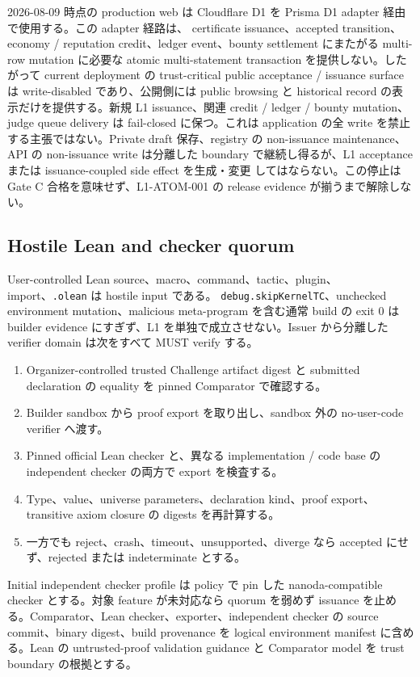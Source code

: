 \documentclass[a4paper,11pt]{ltjsarticle}
\newcommand{\code}[1]{\texttt{#1}}
\begin{document}
2026-08-09 時点の production web は Cloudflare D1 を Prisma D1 adapter 経由で使用する。この adapter 経路は、
certificate issuance、accepted transition、economy / reputation credit、ledger event、bounty settlement にまたがる
multi-row mutation に必要な atomic multi-statement transaction を提供しない。したがって current deployment の
trust-critical public acceptance / issuance surface は write-disabled であり、公開側には public browsing と historical
record の表示だけを提供する。新規 L1 issuance、関連 credit / ledger / bounty mutation、judge queue delivery は fail-closed
に保つ。これは application の全 write を禁止する主張ではない。Private draft 保存、registry の non-issuance maintenance、
API の non-issuance write は分離した boundary で継続し得るが、L1 acceptance または issuance-coupled side effect を生成・変更
してはならない。この停止は Gate C 合格を意味せず、L1-ATOM-001 の release evidence が揃うまで解除しない。

\subsection{Hostile Lean and checker quorum}

User-controlled Lean source、macro、command、tactic、plugin、import、\code{.olean} は hostile input である。
\code{debug.skipKernelTC}、unchecked environment mutation、malicious meta-program を含む通常 build の exit 0 は builder
evidence にすぎず、L1 を単独で成立させない。Issuer から分離した verifier domain は次をすべて MUST verify する。

\begin{enumerate}
  \item Organizer-controlled trusted Challenge artifact digest と submitted declaration の equality を pinned Comparator で確認する。
  \item Builder sandbox から proof export を取り出し、sandbox 外の no-user-code verifier へ渡す。
  \item Pinned official Lean checker と、異なる implementation / code base の independent checker の両方で export を検査する。
  \item Type、value、universe parameters、declaration kind、proof export、transitive axiom closure の digests を再計算する。
  \item 一方でも reject、crash、timeout、unsupported、diverge なら accepted にせず、rejected または indeterminate とする。
\end{enumerate}

Initial independent checker profile は policy で pin した nanoda-compatible checker とする。対象 feature が未対応なら
quorum を弱めず issuance を止める。Comparator、Lean checker、exporter、independent checker の source commit、binary
digest、build provenance を logical environment manifest に含める。Lean の untrusted-proof validation guidance と
Comparator model を trust boundary の根拠とする\cite{leanvalidate,leancomparator}。
\end{document}
